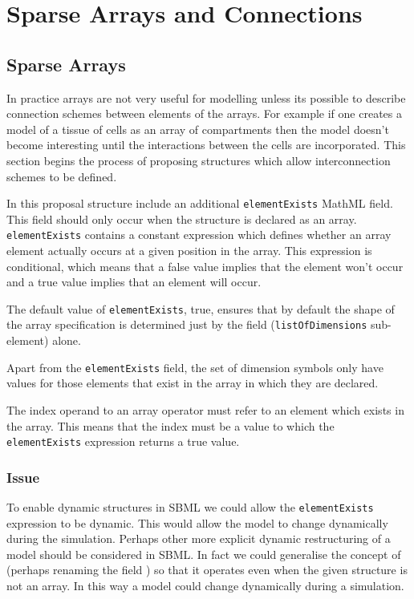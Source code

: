 \documentclass{cekarticle}
\begin{document}
\section{Sparse Arrays and Connections}

\subsection{Sparse Arrays}
\label{sec:sparse}

In practice arrays are not very useful for modelling unless its
possible to describe connection schemes between elements of the
arrays.  For example if one creates a model of a tissue of cells
as an array of compartments then the model doesn't become
interesting until the interactions between the cells are
incorporated.  This section begins the process of proposing
structures which allow interconnection schemes to be defined.

In this proposal  structure include an additional \texttt{elementExists}
MathML field.  This field should only occur when the structure is
declared as an array.  \texttt{elementExists} contains a constant
expression which defines whether an array element actually occurs
at a given position in the array.  This expression is
conditional, which means that a false value implies that
the element won't occur and a true value implies that
an element will occur.

The default value of \texttt{elementExists}, true, ensures that by
default the shape of the array specification is determined just
by the  field (\texttt{listOfDimensions} sub-element) alone.

Apart from the \texttt{elementExists} field, the set of dimension
symbols only have values for those elements that exist in the
array in which they are declared.

The index operand to an array operator must refer to an element
which exists in the array.  This means that the index must be a
value to which the \texttt{elementExists} expression returns a
true value.

\subsubsection{Issue}

To enable dynamic structures in SBML we could allow the
\texttt{elementExists} expression to be dynamic. This would allow
the model to change dynamically during the simulation.  Perhaps
other more explicit dynamic restructuring of a model should be
considered in SBML.
In fact we could generalise the concept of  
(perhaps renaming the field ) so that it operates 
even when the given structure is not an array.  In this way a model 
could change dynamically during a simulation.
\end{document}
